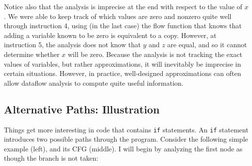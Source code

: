 \documentclass[11pt]{article}
\begin{document}
Notice also that the analysis is imprecise at the end with respect to the value of
$x$.  We were able to keep track of which values are zero and nonzero quite well
through instruction 4, using (in the last case) the flow function that knows
that adding a variable known to be zero is equivalent to a copy.
However, at instruction 5, the analysis does not know that $y$ and $z$ are
equal, and so it cannot determine whether $x$ will be zero.  Because the
analysis is not tracking the exact values of variables, but rather
approximations, it will inevitably be imprecise in certain situations.  However,
in practice, well-designed approximations can often allow dataflow analysis to
compute quite useful information.


\subsection{Alternative Paths: Illustration}
\label{sec:if}

Things get more interesting in \WhileThAddr code that contains \texttt{if}
statements.  An \texttt{if} statement introduces two possible paths through the
program. 
Consider the following simple example (left), and its CFG (middle).  I will
begin by analyzing the first node as though the branch is not taken:
\end{document}
